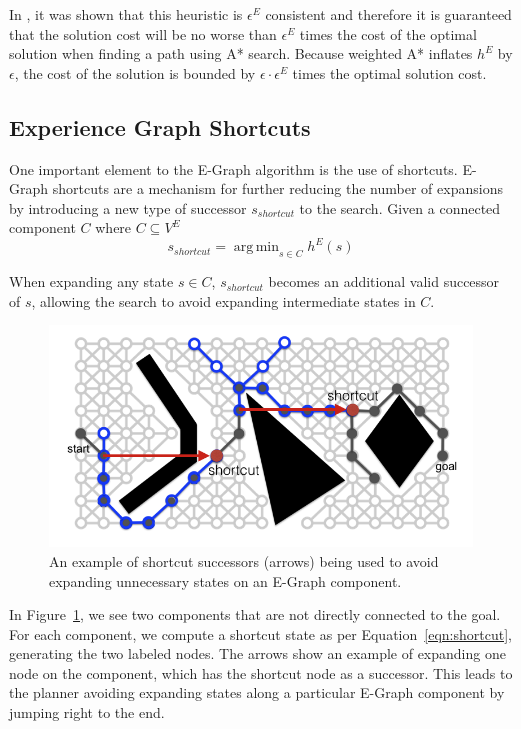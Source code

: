 \documentclass[letterpaper, 10 pt, conference]{ieeeconf}  %
\newcommand{\eqnref}[1]{Equation~\ref{eqn:#1}}
\newcommand{\figref}[1]{Figure~\ref{fig:#1}}
\newcommand{\figlab}[1]{\label{fig:#1}}
\newcommand{\eqnlab}[1]{\label{eqn:#1}}
\DeclareMathOperator*{\argmin}{arg\,min}
\begin{document}
In \cite{PhillipsRSS:2012}, it was shown that this heuristic is $\epsilon^E$
consistent and therefore it is guaranteed that the solution cost will be no
worse than $\epsilon^E$ times the cost of the optimal solution when finding a
path using A* search. Because weighted A* inflates $h^E$ by $\epsilon$, the cost
of the solution is bounded by $\epsilon \cdot \epsilon^E$ times the optimal
solution cost.

\subsection{Experience Graph Shortcuts}
One important element to the E-Graph algorithm is the use of shortcuts. E-Graph
shortcuts are a mechanism for further reducing the number of expansions by
introducing a new type of successor $s_{shortcut}$ to the search.  
Given a connected component $C$ where $C \subseteq
V^E$ 
\begin{equation}
s_{shortcut} = \argmin_{s \in C} h^E(s)
\eqnlab{shortcut}
\end{equation}

When expanding any state $s \in C$, 
$s_{shortcut}$ becomes an additional valid successor of $s$, allowing the search
to avoid expanding intermediate states in $C$.

\begin{figure}
    \centering
    \includegraphics[width=1\columnwidth]{shortcut.png}
    \caption{An example of shortcut successors (arrows) being used to avoid
    expanding unnecessary states on an E-Graph component.}
    \figlab{myshortcut}
\end{figure}

In \figref{myshortcut}, we see two components that are not directly connected to
the goal. For each component, we compute a shortcut state as per
\eqnref{shortcut}, generating the two labeled nodes. The arrows show an example
of expanding one node on the component, which has the shortcut node as a
successor. This leads to the planner avoiding expanding states along a
particular E-Graph component by jumping right to the end. 
\end{document}
